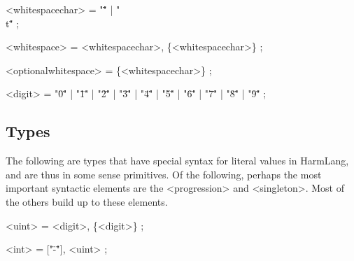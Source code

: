 \documentclass{article}
\begin{document}
\begin{grammar}

<whitespacechar> = "\" \"" | "\"\\t\"" ;

<whitespace> = <whitespacechar>, \{<whitespacechar>\} ;

<optionalwhitespace> = \{<whitespacechar>\} ;

<digit> = "\"0\"" | "\"1\"" | "\"2\"" | "\"3\"" | "\"4\"" | "\"5\"" | "\"6\"" | "\"7\"" | "\"8\"" | "\"9\"" ;




\end{grammar}

\subsection{Types}

The following are types that have special syntax for literal values in HarmLang, and are thus in some sense primitives.  Of the following, perhaps the most important syntactic elements are the <progression> and <singleton>.  Most of the others build up to these elements.

\begin{grammar}

<uint> = <digit>, \{<digit>\} ;

<int> = ["\"-\""], <uint> ;








\end{grammar}
\end{document}
